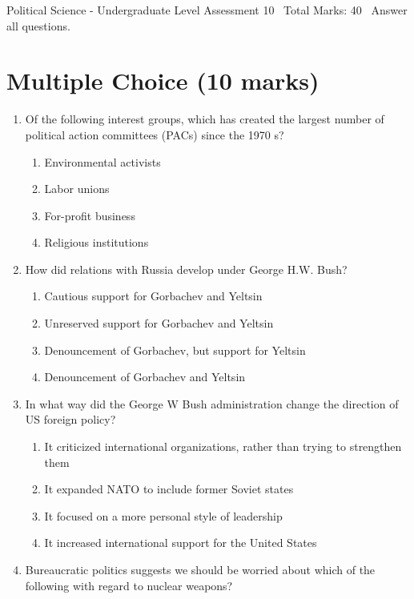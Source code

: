 \documentclass[12pt]{article}
\begin{document}
\begin{center}
Political Science - Undergraduate Level Assessment 10 \
Total Marks: 40 \
Answer all questions.
\end{center}

\section*{Multiple Choice (10 marks)}
\begin{enumerate}[label=\arabic*.]
\item Of the following interest groups, which has created the largest number of political action committees (PACs) since the 1970 s?
\begin{enumerate}[label=(\alph*)]
    \item Environmental activists
    \item Labor unions
    \item For-profit business
    \item Religious institutions
\end{enumerate}
\item How did relations with Russia develop under George H.W. Bush?
\begin{enumerate}[label=(\alph*)]
    \item Cautious support for Gorbachev and Yeltsin
    \item Unreserved support for Gorbachev and Yeltsin
    \item Denouncement of Gorbachev, but support for Yeltsin
    \item Denouncement of Gorbachev and Yeltsin
\end{enumerate}
\item In what way did the George W Bush administration change the direction of US foreign policy?
\begin{enumerate}[label=(\alph*)]
    \item It criticized international organizations, rather than trying to strengthen them
    \item It expanded NATO to include former Soviet states
    \item It focused on a more personal style of leadership
    \item It increased international support for the United States
\end{enumerate}
\item Bureaucratic politics suggests we should be worried about which of the following with regard to nuclear weapons?
\begin{enumerate}[label=(\alph*)]

\end{enumerate}
\end{enumerate}
\end{document}
